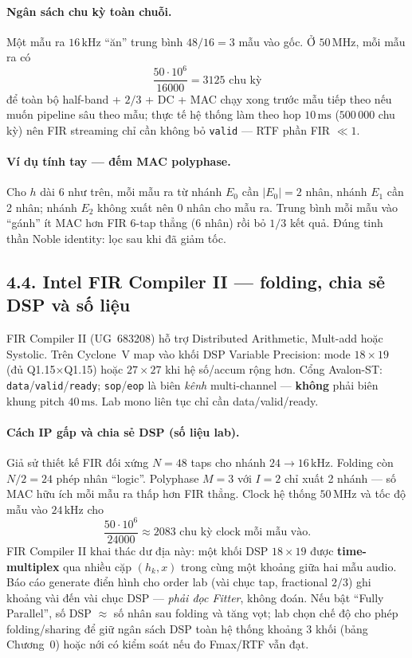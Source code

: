 \paragraph{Ngân sách chu kỳ toàn chuỗi.} Một mẫu ra $16\,\text{kHz}$ ``ăn'' trung bình $48/16=3$ mẫu vào gốc. Ở $50\,\text{MHz}$, mỗi mẫu ra có
\[
\frac{50\cdot 10^{6}}{16000}=3125\text{ chu kỳ}
\]
để toàn bộ half-band + $2/3$ + DC + MAC chạy xong trước mẫu tiếp theo nếu muốn pipeline sâu theo mẫu; thực tế hệ thống làm theo hop $10\,\text{ms}$ ($500\,000$ chu kỳ) nên FIR streaming chỉ cần không bỏ \texttt{valid} --- RTF phần FIR $\ll 1$.

\paragraph{Ví dụ tính tay --- đếm MAC polyphase.} Cho $h$ dài 6 như trên, mỗi mẫu ra từ nhánh $E_0$ cần $|E_0|=2$ nhân, nhánh $E_1$ cần 2 nhân; nhánh $E_2$ không xuất nên 0 nhân cho mẫu ra. Trung bình mỗi mẫu vào ``gánh'' ít MAC hơn FIR 6-tap thẳng (6 nhân) rồi bỏ $1/3$ kết quả. Đúng tinh thần Noble identity: lọc sau khi đã giảm tốc.

\subsection*{4.4. Intel FIR Compiler II --- folding, chia sẻ DSP và số liệu}

FIR Compiler II (UG~683208) hỗ trợ Distributed Arithmetic, Mult-add hoặc Systolic. Trên Cyclone~V map vào khối DSP Variable Precision: mode $18\times 19$ (đủ Q1.15$\times$Q1.15) hoặc $27\times 27$ khi hệ số/accum rộng hơn. Cổng Avalon-ST: \texttt{data}/\texttt{valid}/\texttt{ready}; \texttt{sop}/\texttt{eop} là biên \emph{kênh} multi-channel --- \textbf{không} phải biên khung pitch $40\,\text{ms}$. Lab mono liên tục chỉ cần data/valid/ready.

\paragraph{Cách IP gấp và chia sẻ DSP (số liệu lab).} Giả sử thiết kế FIR đối xứng $N=48$ taps cho nhánh $24\to 16\,\text{kHz}$. Folding còn $N/2=24$ phép nhân ``logic''. Polyphase $M=3$ với $I=2$ chỉ xuất 2 nhánh --- số MAC hữu ích mỗi mẫu ra thấp hơn FIR thẳng. Clock hệ thống $50\,\text{MHz}$ và tốc độ mẫu vào $24\,\text{kHz}$ cho
\[
\frac{50\cdot 10^{6}}{24000}\approx 2083\text{ chu kỳ clock mỗi mẫu vào}.
\]
FIR Compiler II khai thác dư địa này: một khối DSP $18\times 19$ được \textbf{time-multiplex} qua nhiều cặp $(h_k,x)$ trong cùng một khoảng giữa hai mẫu audio. Báo cáo generate điển hình cho order lab (vài chục tap, fractional $2/3$) ghi khoảng vài đến vài chục DSP --- \emph{phải đọc Fitter}, không đoán. Nếu bật ``Fully Parallel'', số DSP $\approx$ số nhân sau folding và tăng vọt; lab chọn chế độ cho phép folding/sharing để giữ ngân sách DSP toàn hệ thống khoảng 3 khối (bảng Chương~0) hoặc nới có kiểm soát nếu đo Fmax/RTF vẫn đạt.

